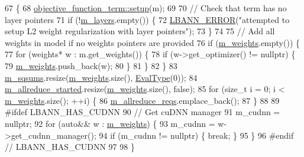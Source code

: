 \begin{DoxyCode}
67                                              \{
68   \hyperlink{classlbann_1_1objective__function__term_a6c8dbdf18aac8676098189fb7b178e91}{objective\_function\_term::setup}(m);
69 
70   \textcolor{comment}{// Check that term has no layer pointers}
71   \textcolor{keywordflow}{if} (!\hyperlink{classlbann_1_1objective__function__term_a9269cf0a237eacd1e220ba2739f44334}{m\_layers}.empty()) \{
72     \hyperlink{base_8hpp_a80b1d707117e968a6951b7222e4b2b87}{LBANN\_ERROR}(\textcolor{stringliteral}{"attempted to setup L2 weight regularization with layer pointers"});
73   \}
74 
75   \textcolor{comment}{// Add all weights in model if no weights pointers are provided}
76   \textcolor{keywordflow}{if} (\hyperlink{classlbann_1_1objective__function__term_a1d601c29153ae9cb54c585887608f2bf}{m\_weights}.empty()) \{
77     \textcolor{keywordflow}{for} (weights* w : m.get\_weights()) \{
78       \textcolor{keywordflow}{if} (w->get\_optimizer() != \textcolor{keyword}{nullptr}) \{
79         \hyperlink{classlbann_1_1objective__function__term_a1d601c29153ae9cb54c585887608f2bf}{m\_weights}.push\_back(w);
80       \}
81     \}
82   \}
83   \hyperlink{classlbann_1_1l2__weight__regularization_a628aabb4e824f2aa861baba93668dc24}{m\_sqsums}.resize(\hyperlink{classlbann_1_1objective__function__term_a1d601c29153ae9cb54c585887608f2bf}{m\_weights}.size(), \hyperlink{base_8hpp_a3266f5ac18504bbadea983c109566867}{EvalType}(0));
84   \hyperlink{classlbann_1_1l2__weight__regularization_a0ae4858adb3279c0019f5e0500bdcf4f}{m\_allreduce\_started}.resize(\hyperlink{classlbann_1_1objective__function__term_a1d601c29153ae9cb54c585887608f2bf}{m\_weights}.size(), \textcolor{keyword}{false});
85   \textcolor{keywordflow}{for} (\textcolor{keywordtype}{size\_t} i = 0; i < \hyperlink{classlbann_1_1objective__function__term_a1d601c29153ae9cb54c585887608f2bf}{m\_weights}.size(); ++i) \{
86     \hyperlink{classlbann_1_1l2__weight__regularization_adf7350e151736d9bae4aa5cf410acd80}{m\_allreduce\_reqs}.emplace\_back();
87   \}
88 
89 \textcolor{preprocessor}{#ifdef LBANN\_HAS\_CUDNN}
90   \textcolor{comment}{// Get cuDNN manager}
91   m\_cudnn = \textcolor{keyword}{nullptr};
92   \textcolor{keywordflow}{for} (\textcolor{keyword}{auto}&& w : \hyperlink{classlbann_1_1objective__function__term_a1d601c29153ae9cb54c585887608f2bf}{m\_weights}) \{
93     m\_cudnn = w->get\_cudnn\_manager();
94     \textcolor{keywordflow}{if} (m\_cudnn != \textcolor{keyword}{nullptr}) \{ \textcolor{keywordflow}{break}; \}
95   \}
96 \textcolor{preprocessor}{#endif // LBANN\_HAS\_CUDNN}
97 
98 \}
\end{DoxyCode}
